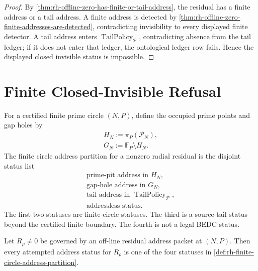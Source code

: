 \begin{proof}
By
\autoref{thm:rh-offline-zero-has-finite-or-tail-address}, the residual
has a finite address or a tail address.  A finite address is detected
by \autoref{thm:rh-offline-zero-finite-addresses-are-detected},
contradicting invisibility to every displayed finite detector.  A tail
address enters $\operatorname{TailPolicy}_{\mathcal P}$, contradicting
absence from the tail ledger; if it does not enter that ledger, the
ontological ledger row fails.  Hence the displayed closed invisible
status is impossible.
\end{proof}

\section{Finite Closed-Invisible Refusal}
\label{sec:rh-offline-zero-finite-closed-invisible-refusal}

\begin{definition}
\label{def:rh-finite-circle-address-partition}
For a certified finite prime circle $(N,P)$, define the occupied prime
points and gap holes by
$$
\begin{gathered}
H_N:=\pi_P(\mathcal P_N),\\
G_N:=\mathbb F_P\setminus H_N.
\end{gathered}
$$
The finite circle address partition for a nonzero radial residual is
the disjoint status list
$$
\begin{gathered}
\text{prime-pit address in }H_N,\\
\text{gap-hole address in }G_N,\\
\text{tail address in }\operatorname{TailPolicy}_{\mathcal P},\\
\text{addressless status.}
\end{gathered}
$$
The first two statuses are finite-circle statuses.  The third is a
source-tail status beyond the certified finite boundary.  The fourth is
not a legal BEDC status.
\end{definition}

\begin{theorem}
\label{thm:rh-finite-circle-address-partition-exhaustive}
Let $R_\rho\ne0$ be governed by an off-line residual address packet at
$(N,P)$.  Then every attempted address status for $R_\rho$ is one of
the four statuses in
\autoref{def:rh-finite-circle-address-partition}.
\end{theorem}

